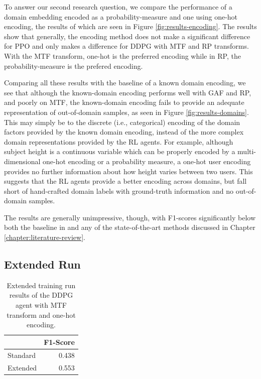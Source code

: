 To answer our second research question, we compare the performance of a domain embedding encoded as a probability-measure and one using one-hot encoding, the results of which are seen in Figure \ref{fig:results-encoding}.
The results show that generally, the encoding method does not make a significant difference for PPO and only makes a difference for DDPG with MTF and RP transforms.
With the MTF transform, one-hot is the preferred encoding while in RP, the probability-measure is the prefered encoding.

Comparing all these results with the baseline of a known domain encoding, we see that although the known-domain encoding performs well with GAF and RP, and poorly on MTF, the known-domain encoding fails to provide an adequate representation of out-of-domain samples, as seen in Figure \ref{fig:results-domains}.
This may simply be to the discrete (i.e., categorical) encoding of the domain factors provided by the known domain encoding, instead of the more complex domain representations provided by the RL agents.
For example, although subject height is a continuous variable which can be properly encoded by a multi-dimensional one-hot encoding or a probability measure, a one-hot user encoding provides no further information about how height varies between two users.
This suggests that the RL agents provide a better encoding across domains, but fall short of hand-crafted domain labels with ground-truth information and no out-of-domain samples.

The results are generally unimpressive, though, with F1-scores significantly below both the baseline in \cite{zheng2019zero} and any of the state-of-the-art methods discussed in Chapter \ref{chapter:literature-review}.

\subsection{Extended Run}\label{subsec:experiments-longer}

\begin{table}[]
	\centering
	\begin{tabular}{@{}lr@{}}
		\toprule
		         & F1-Score \\ \midrule
		Standard & 0.438    \\
		Extended & 0.553    \\ \bottomrule
	\end{tabular}
	\caption{Extended training run results of the DDPG agent with MTF transform and one-hot encoding.}
\end{table}

